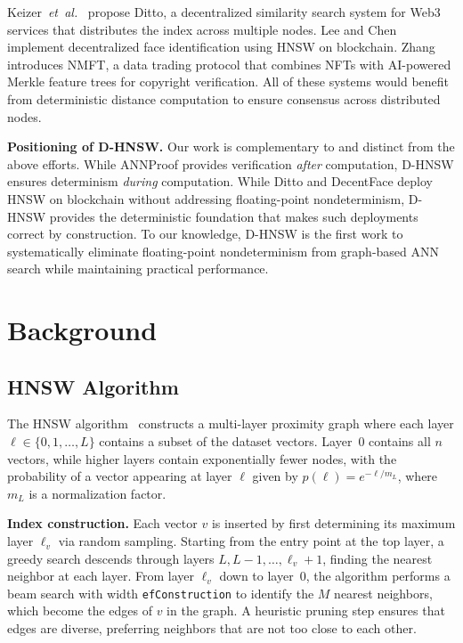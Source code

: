 \documentclass[10pt,journal,compsoc]{IEEEtran}
\newcommand{\dhnsw}{\textsc{D-HNSW}}
\newcommand{\hnsw}{\textsc{HNSW}}
\newcommand{\etal}{\textit{et~al.}}
\begin{document}
Keizer~\etal{}~\cite{keizer2023ditto} propose Ditto, a decentralized similarity search system for Web3 services that distributes the index across multiple nodes. Lee and Chen~\cite{lee2024decentface} implement decentralized face identification using \hnsw{} on blockchain. Zhang~\cite{zhang2024nmft} introduces NMFT, a data trading protocol that combines NFTs with AI-powered Merkle feature trees for copyright verification. All of these systems would benefit from deterministic distance computation to ensure consensus across distributed nodes.

\textbf{Positioning of \dhnsw{}.} Our work is complementary to and distinct from the above efforts. While ANNProof provides verification \emph{after} computation, \dhnsw{} ensures determinism \emph{during} computation. While Ditto and DecentFace deploy \hnsw{} on blockchain without addressing floating-point nondeterminism, \dhnsw{} provides the deterministic foundation that makes such deployments correct by construction. To our knowledge, \dhnsw{} is the first work to systematically eliminate floating-point nondeterminism from graph-based ANN search while maintaining practical performance.

\section{Background}
\label{sec:background}

\subsection{HNSW Algorithm}

The \hnsw{} algorithm~\cite{malkov2020hnsw} constructs a multi-layer proximity graph where each layer $\ell \in \{0, 1, \ldots, L\}$ contains a subset of the dataset vectors. Layer~0 contains all $n$ vectors, while higher layers contain exponentially fewer nodes, with the probability of a vector appearing at layer $\ell$ given by $p(\ell) = e^{-\ell / m_L}$, where $m_L$ is a normalization factor.

\textbf{Index construction.} Each vector $v$ is inserted by first determining its maximum layer $\ell_v$ via random sampling. Starting from the entry point at the top layer, a greedy search descends through layers $L, L{-}1, \ldots, \ell_v{+}1$, finding the nearest neighbor at each layer. From layer $\ell_v$ down to layer~0, the algorithm performs a beam search with width \texttt{efConstruction} to identify the $M$ nearest neighbors, which become the edges of $v$ in the graph. A heuristic pruning step ensures that edges are diverse, preferring neighbors that are not too close to each other.
\end{document}
